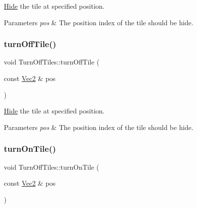 \hyperlink{classHide}{Hide} the tile at specified position. 


\begin{DoxyParams}{Parameters}
{\em pos} & The position index of the tile should be hide. \\
\hline
\end{DoxyParams}
\mbox{\label{classTurnOffTiles_acf0d94735c46519fe4b301accd43a715}} 
\subsubsection{\texorpdfstring{turn\+Off\+Tile()}{turnOffTile()}\hspace{0.1cm}{\footnotesize\ttfamily [2/2]}}
{\footnotesize\ttfamily void Turn\+Off\+Tiles\+::turn\+Off\+Tile (\begin{DoxyParamCaption}\item[{const \hyperlink{classVec2}{Vec2} \&}]{pos }\end{DoxyParamCaption})}



\hyperlink{classHide}{Hide} the tile at specified position. 


\begin{DoxyParams}{Parameters}
{\em pos} & The position index of the tile should be hide. \\
\hline
\end{DoxyParams}
\mbox{\label{classTurnOffTiles_a163856e08a10c7c6f5432c29d560f797}} 
\subsubsection{\texorpdfstring{turn\+On\+Tile()}{turnOnTile()}\hspace{0.1cm}{\footnotesize\ttfamily [1/2]}}
{\footnotesize\ttfamily void Turn\+Off\+Tiles\+::turn\+On\+Tile (\begin{DoxyParamCaption}\item[{const \hyperlink{classVec2}{Vec2} \&}]{pos }\end{DoxyParamCaption})}



